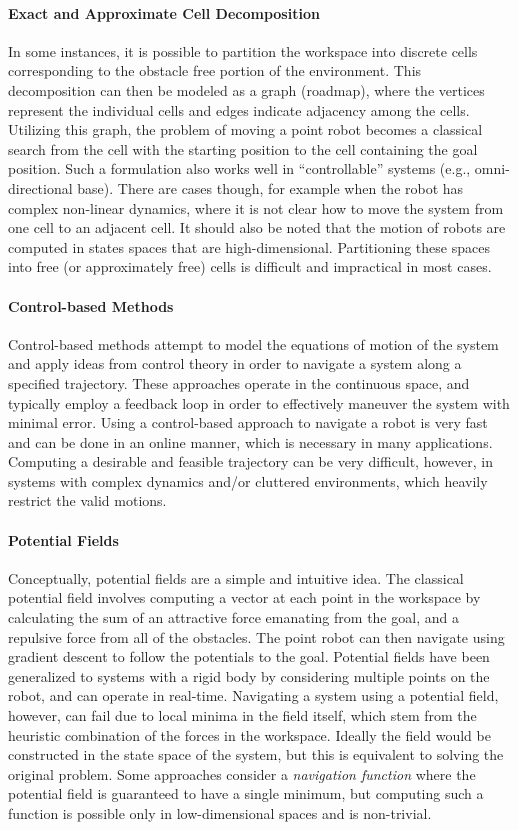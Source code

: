 \paragraph {Exact and Approximate Cell Decomposition}
In some instances, it is possible to partition the workspace into discrete
cells corresponding to the obstacle free portion of the environment. This
decomposition can then be modeled as a graph (roadmap), where the vertices
represent the individual cells and edges indicate adjacency among the cells.
Utilizing this graph, the problem of moving a point robot becomes a classical
search from the cell with the starting position to the cell containing the goal
position. Such a formulation also works well in ``controllable'' systems (e.g.,
omni-directional base). There are cases though, for example when the robot has
complex non-linear dynamics, where it is not clear how to move the system from
one cell to an adjacent cell.  It should also be noted that the motion of
robots are computed in states spaces that are high-dimensional.  Partitioning
these spaces into free (or approximately free) cells is difficult and
impractical in most cases.

\paragraph {Control-based Methods}
Control-based methods attempt to model the equations of motion of the system
and apply ideas from control theory in order to navigate a system along a
specified trajectory.  These approaches operate in the continuous space, and
typically employ a feedback loop in order to effectively maneuver the system
with minimal error.  Using a control-based approach to navigate a robot is
very fast and can be done in an online manner, which is necessary in many
applications.  Computing a desirable and feasible trajectory can be very
difficult, however, in systems with complex dynamics and/or cluttered
environments, which heavily restrict the valid motions.

\paragraph {Potential Fields}
Conceptually, potential fields are a simple and intuitive idea.  The classical
potential field involves computing a vector at each point in the workspace by
calculating the sum of an attractive force emanating from the goal, and a
repulsive force from all of the obstacles. The point robot can then navigate
using gradient descent to follow the potentials to the goal. Potential fields
have been generalized to systems with a rigid body by considering
multiple points on the robot, and can operate in real-time.  Navigating a system
using a potential field, however, can fail due to local minima in the field
itself, which stem from the heuristic combination of the forces in the
workspace.  Ideally the field would be constructed in the state space of the
system, but this is equivalent to solving the original problem.  Some approaches
consider a {\it navigation function} where the potential field is guaranteed to
have a single minimum, but computing such a function is possible only in
low-dimensional spaces and is non-trivial.

